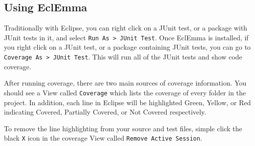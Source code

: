 \documentclass[11pt]{article}
\begin{document}
\subsection{Using EclEmma}

Traditionally with Eclipse, you can right click on a JUnit test, or a package
with JUnit tests in it, and select \verb|Run As > JUnit Test|. Once EclEmma is
installed, if you right click on a JUnit test, or a package containing JUnit
tests, you can go to \verb|Coverage As > JUnit Test|. This will run all of the
JUnit tests and show code coverage.

After running coverage, there are two main sources of coverage information. You
should see a View called \verb|Coverage| which lists the coverage of every
folder in the project. In addition, each line in Eclipse will be highlighted
Green, Yellow, or Red indicating Covered, Partially Covered, or Not Covered
respectively.

To remove the line highlighting from your source and test files, simple click
the black \verb|X| icon in the coverage View called \verb|Remove Active Session|.
\end{document}
